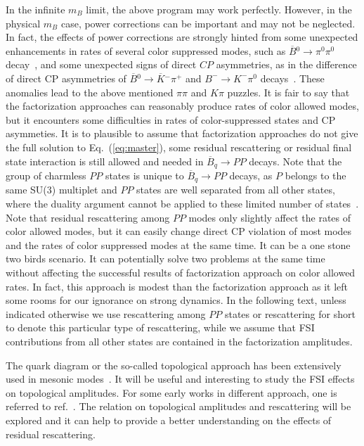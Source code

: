 \documentclass[aps,preprint,floats,epsf,epsfig,nofootinbib,letter]{revtex4}
\newcommand{\ov}{\overline}
\begin{document}
In the infinite $m_B$ limit, the above program may work perfectly.
However, in the physical $m_B$ case, power corrections can be important and may not be neglected.
In fact, 
the effects of power corrections are strongly hinted from some unexpected enhancements in rates of several color suppressed modes, such as $\overline B{}^0\to\pi^0\pi^0$ decay~\cite{PDG,HFAG}, and some unexpected signs of direct $CP$ asymmetries, as in the difference of direct CP asymmetries of $\ov B{}^0\to\ov K{}^-\pi^+$ and $B^-\to K^-\pi^0$ decays~\cite{Lin:2008zzaa}. 
These anomalies lead to the above mentioned $\pi\pi$ and $K\pi$ puzzles.
It is fair to say that the factorization approaches can reasonably produce rates of color allowed modes, 
but it encounters some difficulties in rates of color-suppressed states and CP asymmeties. 
% 
It is to plausible to assume that factorization approaches do not give the full solution to Eq.~(\ref{eq:master}),
some residual rescattering or residual final state interaction is still allowed and needed in $\ov B{}_q\to PP$ decays.
Note that the group of charmless $PP$ states is unique
to $\ov B{}_q\to PP$ decays, as $P$ belongs to the same SU(3) multiplet
and
$PP$ states are well separated from all
other states, where the duality argument cannot be applied to
these limited number of states~\cite{quasielastic,quasielastic0}.
Note that residual rescattering among $PP$ modes only slightly affect the rates of color allowed modes, but it can easily change direct CP violation of most modes and the rates of color suppressed modes at the same time.
It can be a one stone two birds scenario. 
It can potentially solve two problems at the same time without affecting the successful results of factorization approach on color allowed rates. 
In fact, this approach is modest than the factorization approach
as it left some rooms for our ignorance on strong dynamics.
In the following text, unless indicated otherwise we use rescattering among $PP$ states or rescattering for short to denote this particular type of rescattering, while we assume that FSI contributions from all other states are contained in the factorization amplitudes. 

The quark diagram or the so-called topological
approach has been extensively used in mesonic modes~\cite{Zeppenfeld:1980ex,Chau:tk,Chau:1990ay,Gronau:1994rj,Gronau:1995hn,Cheng:2014rfa, Gronau}.
It will be useful and interesting to study the FSI effects on topological amplitudes.
For some early works in different approach, one is referred to ref.~\cite{Gronau}.  
The relation on topological amplitudes and rescattering will be explored 
and it can help to provide a better understanding on the effects of residual rescattering.
\end{document}
